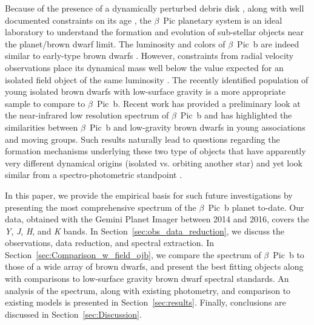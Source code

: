 \documentclass[twocolumn]{aastex6}
\begin{document}
 Because of the presence of a dynamically perturbed debris disk \citep{Mouillet1997,2012A&A...542A..40L,MillarBlanchaer2015}, along with well documented constraints on its age \citep{Bell2015}, the $\beta$~Pic planetary system is an ideal laboratory to understand the formation and evolution of sub-stellar objects near the planet/brown dwarf limit. The luminosity and colors of $\beta$~Pic~b are indeed similar to early-type brown dwarfs \citep{Males2014,Morzinski2015,Bonnefoy2014,Currie2013}. However, constraints from radial velocity observations place its dynamical mass well below the value expected for an isolated field object of the same luminosity \citep{Lagrange2012}. The recently identified population of young isolated brown dwarfs with low-surface gravity \citep{Kirkpatrick:2008ec,Allers2013,2009AJ....137.3345C,2012A&A...548A..26D,Faherty:2013bc, Gagne:2015dc, Schneider:2016iq} is a more appropriate sample to compare to $\beta$~Pic~b. Recent work has provided a preliminary look at the near-infrared low resolution spectrum of $\beta$~Pic~b \citep{Bonnefoy2014, Chilcote2015, Baudino2015} and has highlighted the similarities between $\beta$~Pic~b and low-gravity brown dwarfs in young associations and moving groups. Such results naturally lead to questions regarding the formation mechanisms underlying these two type of objects that have apparently very different dynamical origins (isolated vs. orbiting another star) and yet look similar from a spectro-photometric standpoint \citep{Baudino2015}.
 
 In this paper, we provide the empirical basis for such future investigations by presenting the most comprehensive spectrum of the $\beta$~Pic~b planet to-date. Our data, obtained with the Gemini Planet Imager between 2014 and 2016, covers the {\it Y}, {\it J}, {\it H}, and {\it K} bands. In Section~\ref{sec:obs_data_reduction}, we discuss the observations, data reduction, and spectral extraction. In Section~\ref{sec:Comparison_w_field_ojb}, we compare the spectrum of $\beta$~Pic~b to those of a wide array of brown dwarfs, and present the best fitting objects along with comparisons to low-surface gravity brown dwarf spectral standards. An analysis of the spectrum, along with existing photometry, and comparison to existing models is presented in Section~\ref{sec:results}. Finally, conclusions are discussed in Section~\ref{sec:Discussion}.


\end{document}
